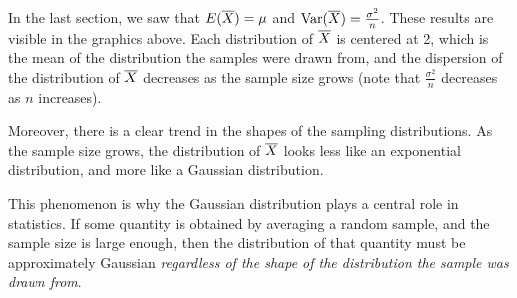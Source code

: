 \begin{center}
    \begin{minipage}{.5\textwidth}
        \centering
    \end{minipage}%
    \begin{minipage}{0.5\textwidth}
        \centering
\end{minipage}
\end{center}

In the last section, we saw that $E({\overline{X}}) = \mu$ and $\operatorname{Var}({\overline{X}}) = \frac{\sigma^2}{n}$. These results are visible in the graphics above. Each distribution of ${\overline{X}}$ is centered at 2, which is the mean of the distribution the samples were drawn from, and the dispersion of the distribution of ${\overline{X}}$ decreases as the sample size grows (note that $\frac{\sigma^2}{n}$ decreases as $n$ increases).

Moreover, there is a clear trend in the shapes of the sampling distributions. As the sample size grows, the distribution of ${\overline{X}}$ looks less like an exponential distribution, and more like a Gaussian distribution.

This phenomenon is why the Gaussian distribution plays a central role in statistics. If some quantity is obtained by averaging a random sample, and the sample size is large enough, then the distribution of that quantity must be approximately Gaussian \emph{regardless of the shape of the distribution the sample was drawn from}.

